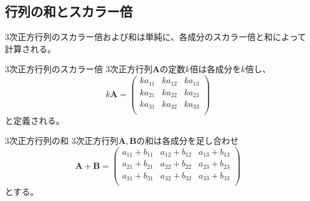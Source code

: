 \subsection{行列の和とスカラー倍}
3次正方行列のスカラー倍および和は単純に、各成分のスカラー倍と和によって計算される。
\begin{definition*}{3次正方行列のスカラー倍}
	3次正方行列\(\boldsymbol{A}\)の定数\(k\)倍は各成分を\(k\)倍し、
	\begin{equation}
		k\boldsymbol{A}=
		\begin{pmatrix}
			ka_{11} & ka_{12} & ka_{13} \\
			ka_{21} & ka_{22} & ka_{23} \\
			ka_{31} & ka_{32} & ka_{33} \\
		\end{pmatrix}
	\end{equation}
	と定義される。
\end{definition*}
\begin{definition*}{3次正方行列の和}
	3次正方行列\(\boldsymbol{A},\boldsymbol{B}\)の和は各成分を足し合わせ
	\begin{equation}
		\boldsymbol{A}+\boldsymbol{B}=
		\begin{pmatrix}
			a_{11}+b_{11} & a_{12}+b_{12}   & a_{13}+b_{13}  \\
			a_{21}+b_{21} & a_{22} + b_{22} & a_{23} +b_{23} \\
			a_{31}+b_{31} & a_{32} + b_{32} & a_{33} +b_{33} \\
		\end{pmatrix}
	\end{equation}
	とする。
\end{definition*}
